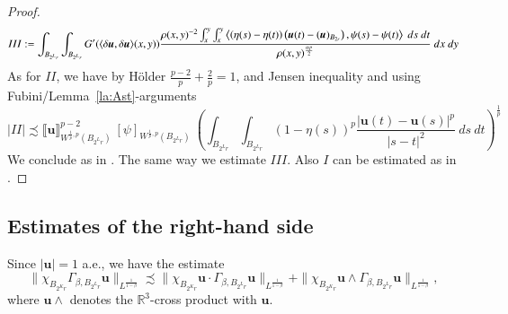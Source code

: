 \documentclass[a4paper,10pt,intlimits,ngerman]{amsart}
\newcommand{\iv}{B} %
\numberwithin{equation}{section}
\newcommand{\R}{\mathbb{R}}
\newcommand{\solu}{{\boldsymbol{u}}}
\newcommand{\aleq}{\precsim}
\newcommand{\brac}[1]{\left ( #1 \right )}
\newcommand{\dmv}[2]{\langle \delta #1, \delta #2\rangle}
\begin{document}
\begin{proof}
\[  \]
   \[III:=\int_{\iv_{2^L r}} \int_{\iv_{2^L r}} G'(\dmv{\solu}{\solu}(x,y)) \frac{\rho(x,y)^{-2} \int_x^y\int_x^y\left \langle \brac{\eta(s)-\eta(t)} \brac{\solu(t)-(\solu)_{\iv_{2r}}},\psi(s) - \psi(t) \right \rangle \ ds\ dt}{{\rho(x,y)^{\frac{\alpha p}{2}}}}\ dx\ dy\\
\]
As for $II$, we have by H\"older $\frac{p-2}{p} + \frac{2}{p} = 1$, and Jensen inequality and using Fubini/Lemma~\ref{la:Ast}-arguments 
\[
 |II| \aleq \llbracket \solu \rrbracket_{W^{\frac{1}{p},p}(\iv_{2^L r})}^{p-2}\ [\psi]_{W^{\frac{1}{p},p}(\iv_{2^L r})}\ \brac{\int_{\iv_{2^L r}} \int_{\iv_{2^L r}} (1-\eta(s))^p \frac{|\solu(t)-\solu(s)|^p}{|s-t|^{2}}\ ds\ dt}^{\frac{1}{p}}
\]
We conclude as in \cite[Proof of Lemma 3.2., Proposition D.1, Proposition D.2]{SchikorraCPDE14}. The same way we estimate $III$.
Also $I$ can be estimated as in  \cite[Proof of Lemma 3.2.]{SchikorraCPDE14}.
\end{proof}

\subsection{Estimates of the right-hand side}
Since $|\solu| = 1$ a.e., we have the estimate
\begin{equation}\label{eq:chisplit}
\|\chi_{\iv_{2^K r}} \Gamma_{\beta,\iv_{2^L r}}\solu\|_{L^{\frac{1}{1-\beta}}} \aleq  \|\chi_{\iv_{2^K r}} \solu \cdot \Gamma_{\beta,\iv_{2^L r}}\solu\|_{L^{\frac{1}{1-\beta}}} + \|\chi_{\iv_{2^K r}} \solu\wedge \Gamma_{\beta,\iv_{2^L r}}\solu\|_{L^{\frac{1}{1-\beta}}},
\end{equation}
where $\solu\wedge$ denotes the $\R^3$-cross product with $\solu$.
\end{document}
